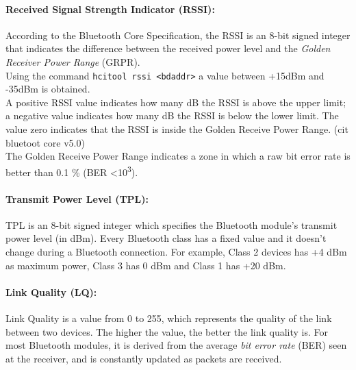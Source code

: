 \paragraph{Received Signal Strength Indicator (RSSI):}
According to the Bluetooth Core Specification, the RSSI is an 8-bit signed integer that indicates the difference between the received power level and the \textit{Golden Receiver Power Range} (GRPR). \\
Using the command \texttt{hcitool rssi \textless bdaddr\textgreater} a value between +15dBm and -35dBm is obtained. \\
A positive RSSI value indicates how many dB the RSSI is above the upper limit; a negative value indicates how many dB the RSSI is below the lower limit. The value zero indicates that the RSSI is inside the Golden Receive Power Range. (cit bluetoot core v5.0)\\
The Golden Receive Power Range indicates a zone in which a raw bit error rate is better than 0.1 \% (BER \textless 10\textsuperscript{3}).

\paragraph{Transmit Power Level (TPL):}
TPL is an 8-bit signed integer which specifies the Bluetooth module's transmit power level (in dBm). Every Bluetooth class has a fixed value and it doesn't change during a Bluetooth connection. For example, Class 2 devices has +4 dBm as maximum power, Class 3 has 0 dBm and Class 1 has +20 dBm.

\paragraph{Link Quality (LQ):}
Link Quality is a value from 0 to 255, which represents the quality of the link between two devices. The higher the value, the better the link quality is. For most Bluetooth modules, it is derived from the average \textit{bit error rate} (BER) seen at the receiver, and is constantly updated as packets are received.

